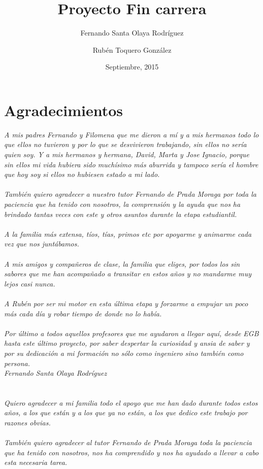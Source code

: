\documentclass[b5paper,10pt,twoside]{book}
\title{Proyecto Fin carrera}
\author{Fernando Santa Olaya Rodríguez \\
	\and 
	Rubén Toquero González}
\date{Septiembre, 2015}
\begin{document}
	\maketitle
	

	\chapter*{Agradecimientos}

	
	\textit{A mis padres Fernando y Filomena que me dieron a mí y a mis hermanos todo lo que ellos no tuvieron y por lo que se desvivieron trabajando, sin ellos no sería quien soy. Y a mis hermanos y hermana, David, Marta y Jose Ignacio, porque sin ellos mi vida hubiera sido muchísimo más aburrida y tampoco sería el hombre que hoy soy si ellos no hubiesen estado a mi lado.\\\\
		También quiero agradecer a nuestro tutor Fernando de Prada Moraga por toda la paciencia que ha tenido con nosotros, la comprensión y la ayuda que nos ha brindado tantas veces con este y otros asuntos durante la etapa estudiantil.\\\\
		A la familia más extensa, tíos, tías, primos etc por apoyarme y animarme cada vez que nos juntábamos.\\\\
		A mis amigos y compañeros de clase, la familia que eliges, por todos los sin sabores que me han acompañado a transitar en estos años y no mandarme muy lejos casi nunca.\\\\
		A Rubén por ser mi motor en esta última etapa y forzarme a empujar un poco más cada día y robar tiempo de donde no lo había.\\\\
		Por último a todos aquellos profesores que me ayudaron a llegar aquí, desde EGB hasta este último proyecto, por saber despertar la curiosidad y ansia de saber y por su dedicación a mi formación no sólo como ingeniero sino también como persona.\\
		Fernando Santa Olaya Rodríguez\\\\\\
		Quiero agradecer a mi familia todo el apoyo que me han dado durante todos estos años, a los que están y a los que ya no están, a los que dedico este trabajo por razones obvias.\\\\
		También quiero agradecer al tutor Fernando de Prada Moraga toda la paciencia que ha tenido con nosotros, nos ha comprendido y nos ha ayudado a llevar a cabo esta necesaria tarea.\\\\
}
\end{document}

